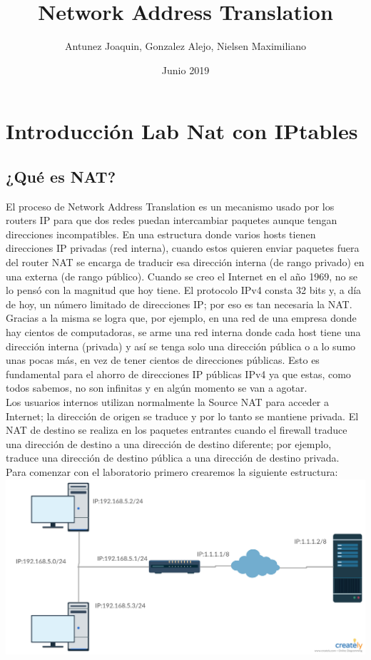 \documentclass{article}
\title {Network Address Translation}
\author{Antunez Joaquin, Gonzalez Alejo, Nielsen Maximiliano}
\date{Junio 2019}
\begin{document}
 
\begin{titlepage}
\pagestyle{empty}
\maketitle
\thispagestyle{empty}
\end{titlepage}

\section*{Introducción Lab Nat con IPtables}

\subsection*{¿Qué es NAT?}

El proceso de Network Address Translation es un mecanismo usado por los routers IP para que dos redes puedan intercambiar paquetes aunque tengan direcciones incompatibles.
En una estructura donde varios hosts tienen direcciones IP privadas (red interna), cuando estos quieren enviar paquetes fuera del router NAT se encarga de traducir esa dirección interna (de rango privado) en una externa (de rango público).
Cuando se creo el Internet en el año 1969, no se lo pensó con la magnitud que hoy tiene.
El protocolo IPv4 consta 32 bits y, a día de hoy, un número limitado de direcciones IP; por eso es tan necesaria la NAT. Gracias a la misma se logra que, por ejemplo, en una red de una empresa donde hay cientos de computadoras, se arme una red interna donde cada host tiene una dirección interna (privada) y así se tenga solo una dirección pública o a lo sumo unas pocas más, en vez de tener cientos de direcciones públicas. Esto es fundamental para el ahorro de direcciones IP públicas IPv4 ya que estas, como todos sabemos, no son infinitas y en algún momento se van a agotar.\\
Los usuarios internos utilizan normalmente la Source NAT para acceder a Internet; la dirección de origen se traduce y por lo tanto se mantiene privada.
El NAT de destino se realiza en los paquetes entrantes cuando el firewall traduce una dirección de destino a una dirección de destino diferente; por ejemplo, traduce una dirección de destino pública a una dirección de destino privada.
\\
Para comenzar con el laboratorio primero crearemos la siguiente estructura:\\
\includegraphics[width=\textwidth]{graficolab}
\end{document}
